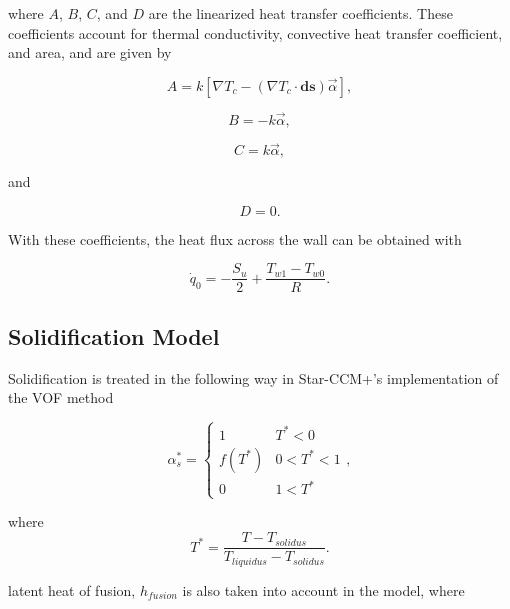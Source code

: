 \documentclass{UCF_ETD}
\begin{document}
where $A$, $B$, $C$, and $D$ are the linearized heat transfer coefficients. These coefficients account for thermal conductivity, convective heat transfer coefficient, and area, and are given by

\begin{equation}
    A = k\left[ \nabla T_{c} - \left( \nabla T_{c} \cdot \mathbf{ds} \right) \vec{\alpha}\right],
    \label{eq:HTC_A}
\end{equation}

\begin{equation}
    B = -k\vec{\alpha},
    \label{eq:HTC_B}
\end{equation}

\begin{equation}
    C = k\vec{\alpha},
    \label{eq:HTC_C}
\end{equation}

and

\begin{equation}
    D = 0. 
    \label{eq:HTC_D}
\end{equation}

With these coefficients, the heat flux across the wall can be obtained with

\begin{equation}
    \dot{q}_0=-\frac{S_u}{2}+\frac{T_{w 1}-T_{w 0}}{R}.
    \label{eq:wallHF}
\end{equation}

\subsection{Solidification Model}
\label{sec:solidmodel}
Solidification is treated in the following way in Star-CCM+'s implementation of the VOF method \cite{starccm}

\begin{equation}
    \alpha^{*}_{s} = \begin{cases}
    1 & T^{*} < 0 \\
    f(T^{*})& 0<T^{*}<1 \\
    0& 1 < T^{*}
    \end{cases},
    \label{eq:solidificationModel}
\end{equation}

\noindent where
\begin{equation}
    T^{*} = \frac{T - T_{solidus}}{T_{liquidus} - T_{solidus}}.
\end{equation}

\noindent latent heat of fusion, $h_{fusion}$ is also taken into account in the model, where
\end{document}
